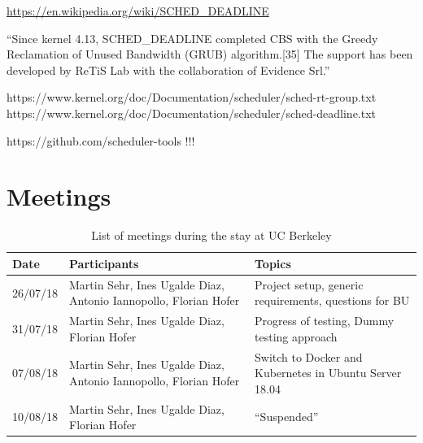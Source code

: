 \documentclass[]{scrartcl}
\begin{document}
\url{https://en.wikipedia.org/wiki/SCHED_DEADLINE}

``Since kernel 4.13, SCHED\_DEADLINE completed CBS with the Greedy Reclamation of Unused Bandwidth (GRUB) algorithm.[35] The support has been developed by ReTiS Lab with the collaboration of Evidence Srl.''


https://www.kernel.org/doc/Documentation/scheduler/sched-rt-group.txt
https://www.kernel.org/doc/Documentation/scheduler/sched-deadline.txt


https://github.com/scheduler-tools !!!


\section{Meetings}

\begin{table}[h]
	\centering
	\caption{List of meetings during the stay at UC Berkeley}
	
	\begin{tabular}{l p{5cm} p{5cm}}
	Date & Participants & Topics \\
	\hline
	26/07/18 & Martin Sehr, Ines Ugalde Diaz, Antonio Iannopollo, Florian Hofer & Project setup, generic requirements, questions for BU\\
	31/07/18 & Martin Sehr, Ines Ugalde Diaz, Florian Hofer & Progress of testing, Dummy testing approach\\
	07/08/18 & Martin Sehr, Ines Ugalde Diaz, Antonio Iannopollo, Florian Hofer & Switch to Docker and Kubernetes in Ubuntu Server 18.04\\
	10/08/18 & Martin Sehr, Ines Ugalde Diaz, Florian Hofer & ``Suspended''\\
	\hline
	\end{tabular}
	
	\label{tab:meeting}
\end{table}



\end{document}
